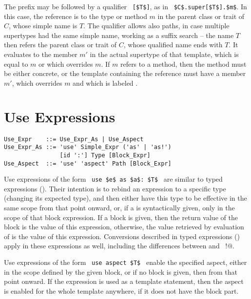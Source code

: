 The  prefix may be followed by a qualifier ~\lstinline![$T$]!, as in ~\lstinline!$C$.super[$T$].$m$!. In this case, the reference is to the type or method $m$ in the parent class or trait of $C$, whose simple name is $T$. The qualifier allows also paths, in case multiple supertypes had the same simple name, working as a suffix search -- the name $T$ then refers the parent class or trait of $C$, whose qualified name ends with $T$. It evaluates to the member $m'$ in the actual supertype of that template, which is equal to $m$ or which overrides $m$. If $m$ refers to a method, then the method must be either concrete, or the template containing the reference must have a member $m'$, which overrides $m$ and which is labeled . 






\section{Use Expressions}
\label{sec:use-expressions}

\syntax\begin{lstlisting}
Use_Expr    ::= Use_Expr_As | Use_Aspect
Use_Expr_As ::= 'use' Simple_Expr ('as' | 'as!')
                [id ':'] Type [Block_Expr]
Use_Aspect  ::= 'use' 'aspect' Path [Block_Expr]
\end{lstlisting}

Use expressions of the form ~\lstinline!use $e$ as $a$: $T$!~ are similar to typed expressions (). Their intention is to rebind an expression to a specific type (changing its expected type), and then either have this type to be effective in the same scope from that point onward, or, if a  is syntactically given, only in the scope of that block expression. If a block is given, then the return value of the block is the value of this expression, otherwise, the value retrieved by evaluation of  is the value of this expression. Conversions described in typed expressions () apply in these expressions as well, including the differences between  and ~\lstinline@as!@. 

Use expressions of the form ~\lstinline!use aspect $T$!~ enable the specified aspect, either in the scope defined by the given block, or if no block is given, then from that point onward. If the expression is used as a template statement, then the aspect is enabled for the whole template anywhere, if it does not have the block part. 








